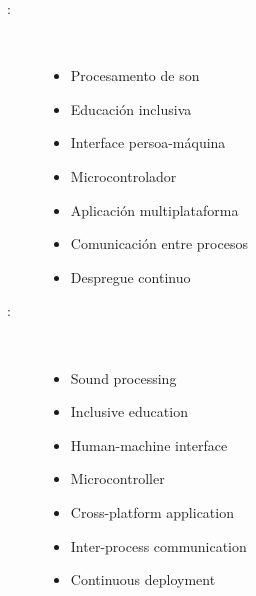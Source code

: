 \begin{multicols}{2}
\begin{description}
\item [\palabraschaveprincipal:] \mbox{} \\[-20pt]
  \begin{itemize}
    \item Procesamento de son
    \item Educación inclusiva
    \item Interface persoa-máquina
    \item Microcontrolador
    \item Aplicación multiplataforma
    \item Comunicación entre procesos
    \item Despregue continuo
  \end{itemize}
\end{description}
\begin{description}
\item [\palabraschavesecundaria:] \mbox{} \\[-20pt]
\begin{itemize}
  \item Sound processing
  \item Inclusive education
  \item Human-machine interface
  \item Microcontroller
  \item Cross-platform application
  \item Inter-process communication
  \item Continuous deployment
\end{itemize}

\end{description}
\end{multicols}
